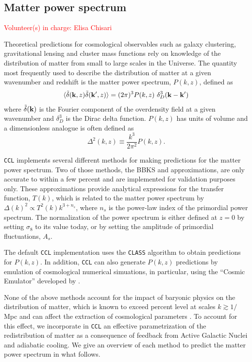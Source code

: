 \documentclass[\docopts]{\docclass}
\newcommand{\vol}[1]{\textcolor{red}{Volunteer(s) in charge: #1}}
\newcommand{\ccl}{{\tt CCL}\xspace}
\begin{document}
\subsection{Matter power spectrum}
\label{sec:matterps}
\vol{Elisa Chisari}

Theoretical predictions for cosmological observables such as galaxy clustering, gravitational lensing and cluster mass functions rely on knowledge of the distribution of matter from small to large scales in the Universe. The quantity most frequently used to describe the distribution of matter at a given wavenumber and redshift is the matter power spectrum, $P(k,z)$, defined as
\begin{equation}
  \langle \tilde\delta({\bf k},z)\tilde\delta({\bf k}^\prime,z)\rangle = (2\pi)^3P(k,z)\
\delta_D^3({\bf k}-{\bf k}')
\end{equation}
where $\tilde\delta({\bf k})$ is the Fourier component of the overdensity field at a given wavenumber and $\delta_D^3$ is the Dirac delta function. $P(k,z)$ has units of volume and a dimensionless analogue is often defined as
\begin{equation}
  \Delta^2(k,z) \equiv \frac{k^3}{2\pi^2}P(k,z).
\end{equation}

\ccl implements several different methods for making predictions for the matter power spectrum. Two of those methods, the BBKS \citep{BBKS} and \citet{1998ApJ...496..605E} approximations, are only accurate to within a few percent and are implemented for validation purposes only. These approximations provide analytical expressions for the transfer function, $T(k)$, which is related to the matter power spectrum by $\Delta(k)^2 \propto T^2(k) k^{3+n_s}$, where $n_s$ is the power-law index of the primordial power spectrum. The normalization of the power spectrum is either defined at $z=0$ by setting $\sigma_8$ to its value today, or by setting the amplitude of primordial fluctuations, $A_s$.

The default \ccl implementation uses the {\tt CLASS} algorithm \citet{class} to obtain predictions for $P(k,z)$. In addition, \ccl can also generate $P(k,z)$ predictions by emulation of cosmological numerical simuations, in particular, using the ``Cosmic Emulator'' developed by \citet{Lawrence17}. 

None of the above methods account for the impact of baryonic physics on the distribution of matter, which is known to exceed percent level at scales $k \gtrsim 1/$Mpc \citep{vanDaalen11,Illustris,Hellwing16,Springel17} and can affect the extraction of cosmological parameters \citep{Semboloni11,Semboloni13,Mohammed14,Eifler15,Mohammed17}. To account for this effect, we incorporate in \ccl an effective parametrization \citep{Schneider15} of the redistribution of matter as a consequence of feedback from Active Galactic Nuclei and adiabatic cooling. We give an overview of each method to predict the matter power spectrum in what follows.
\end{document}
